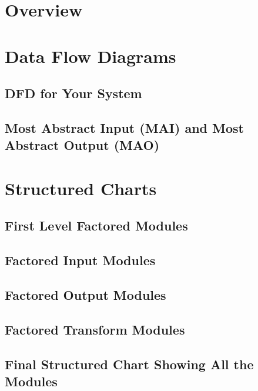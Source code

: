 \documentclass{article}
\begin{document}
\section{Overview}

\section{Data Flow Diagrams}
\subsection{DFD for Your System}

\subsection{Most Abstract Input (MAI) and Most Abstract Output (MAO)}

\section{Structured Charts}
\subsection{First Level Factored Modules}

\subsection{Factored Input Modules}

\subsection{Factored Output Modules}

\subsection{Factored Transform Modules}

\subsection{Final Structured Chart Showing All the Modules}
\end{document}
